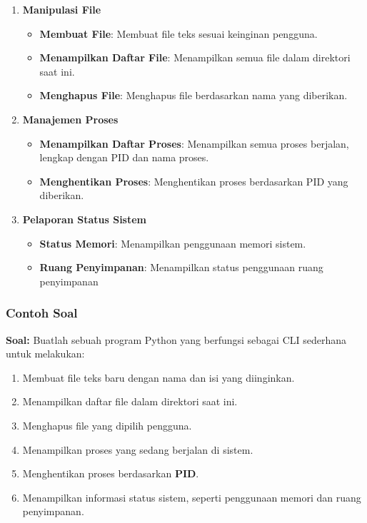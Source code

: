 \documentclass[12pt]{article}
\begin{document}
\begin{enumerate}
    \item \textbf{Manipulasi File}
    \begin{itemize}
        \item \textbf{Membuat File}: Membuat file teks sesuai keinginan pengguna.
        \item \textbf{Menampilkan Daftar File}: Menampilkan semua file dalam direktori saat ini.
        \item \textbf{Menghapus File}: Menghapus file berdasarkan nama yang diberikan.
    \end{itemize}
    \item \textbf{Manajemen Proses}
    \begin{itemize}
        \item \textbf{Menampilkan Daftar Proses}: Menampilkan semua proses berjalan, lengkap dengan PID dan nama proses.
        \item \textbf{Menghentikan Proses}: Menghentikan proses berdasarkan PID yang diberikan.
    \end{itemize}
    \item \textbf{Pelaporan Status Sistem}
    \begin{itemize}
        \item \textbf{Status Memori}: Menampilkan penggunaan memori sistem.
        \item \textbf{Ruang Penyimpanan}: Menampilkan status penggunaan ruang penyimpanan
    \end{itemize}
\end{enumerate}
 
\subsubsection{\textbf{Contoh Soal}}

\textbf{Soal:} Buatlah sebuah program Python yang berfungsi sebagai CLI sederhana untuk melakukan:

\begin{enumerate}
    \item Membuat file teks baru dengan nama dan isi yang diinginkan.
    \item Menampilkan daftar file dalam direktori saat ini.
    \item Menghapus file yang dipilih pengguna.
    \item Menampilkan proses yang sedang berjalan di sistem.
    \item Menghentikan proses berdasarkan \textbf{PID}.
    \item Menampilkan informasi status sistem, seperti penggunaan memori dan ruang penyimpanan.
\end{enumerate}
\end{document}
